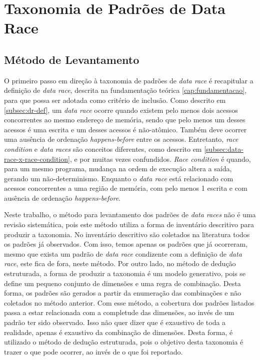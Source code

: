 \section{Taxonomia de Padrões de Data Race}
\label{sec:taxonomy}

\subsection{Método de Levantamento}

O primeiro passo em direção à taxonomia de padrões de \textit{data race} é recapitular a definição de \textit{data race}, descrita na fundamentação teórica \ref{cap:fundamentacao}, para que possa ser adotada como critério de inclusão. Como descrito em \ref{subsec:dr-def}, um \textit{data race} ocorre quando existem pelo menos dois acessos concorrentes ao mesmo endereço de memória, sendo que pelo menos um desses acessos é uma escrita e um desses acessos é não-atômico. Também deve ocorrer uma ausência de ordenação \textit{happens-before} entre os acessos. Entretanto, \textit{race condition} e \textit{data races} são conceitos diferentes, como descrito em \ref{subsec:data-race-x-race-condition}, e por muitas vezes confundidos. \textit{Race condition} é quando, para um mesmo programa, mudança na ordem de execução altera a saída, gerando um não-determinismo. Enquanto o \textit{data race} está relacionado com acessos concorrentes a uma região de memória, com pelo menos 1 escrita e com ausência de ordenação \textit{happens-before}.

Neste trabalho, o método para levantamento dos padrões de \textit{data races} não é uma revisão sistemática, pois este método utiliza a forma de inventário descritivo para produzir a taxonomia. No inventário descritivo são coletados na literatura todos os padrões já observados. Com isso, temos apenas os padrões que já ocorreram, mesmo que exista um padrão de \textit{data race} condizente com a definição de \textit{data race}, este fica de fora, neste método. Por outro lado, no método de dedução estruturada, a forma de produzir a taxonomia é um modelo generativo, pois se define um pequeno conjunto de dimensões e uma regra de combinação. Desta forma, os padrões são gerados a partir da enumeração das combinações e não coletados no método anterior. Com esse método, a cobertura dos padrões listados passa a estar relacionada com a completude das dimensões, ao invés de um padrão ter sido observado. Isso não quer dizer que é exaustivo de toda a realidade, apenas é exaustivo da combinação de dimensões. Desta forma, é utilizado o método de dedução estruturada, pois o objetivo desta taxonomia é trazer o que pode ocorrer, ao invés de o que foi reportado.

